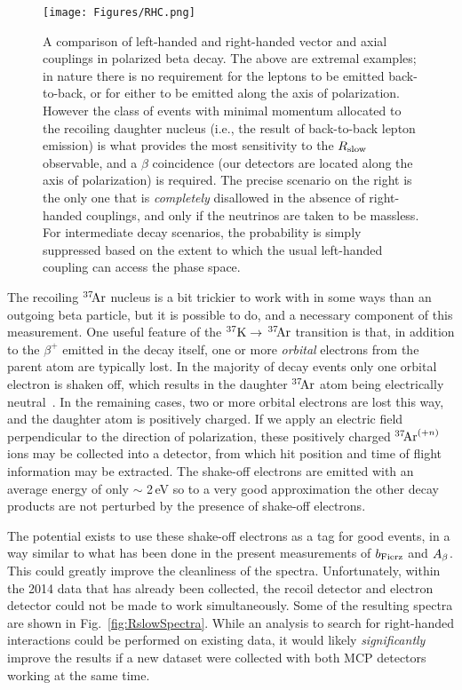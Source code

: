 \begin{figure}[h!t!b!]
	\centering
	\texttt{[image: Figures/RHC.png]}
	\caption[A Comparison of Left-Handed and Right-Handed Couplings]{A comparison of left-handed and right-handed vector and axial couplings in polarized beta decay.  The above are extremal examples;  in nature there is no requirement for the leptons to be emitted back-to-back, or for either to be emitted along the axis of polarization.  However the class of events with minimal momentum allocated to the recoiling daughter nucleus (i.e., the result of back-to-back lepton emission) is what provides the most sensitivity to the $R_{\textrm{slow}}$ observable, and a $\beta$ coincidence (our detectors are located along the axis of polarization) is required.
	The precise scenario on the right is the only one that is \emph{completely} disallowed in the absence of right-handed couplings, and only if the neutrinos are taken to be massless.  For intermediate decay scenarios, the probability is simply suppressed based on the extent to which the usual left-handed coupling can access the phase space.
	\label{fig:rhc}
	}
\end{figure}

The recoiling $^{37}\textrm{\!Ar}$ nucleus is a bit trickier to work with in some ways than an outgoing beta particle, but it is possible to do, and a necessary component of this measurement.  One useful feature of the $^{37}\textrm{K} \rightarrow \,^{37}\textrm{\!Ar}$ transition is that, in addition to the $\beta^+$ emitted in the decay itself, one or more \emph{orbital} electrons from the parent atom are typically lost.  In the majority of decay events only one orbital electron is shaken off, which results in the daughter $^{37}\textrm{\!Ar}$ atom being electrically neutral~\cite{gorelov2000}\cite{dan_thesis}.  In the remaining cases, two or more orbital electrons are lost this way, and the daughter atom is positively charged.  If we apply an electric field perpendicular to the direction of polarization, these positively charged $^{37}\textrm{\!Ar}^{(+n)}$ ions may be collected into a detector, from which hit position and time of flight information may be extracted.  The shake-off electrons are emitted with an average energy of only $\sim$ 2\,eV so to a very good approximation the other decay products are not perturbed by the presence of shake-off electrons\cite{Levinger}.  

The potential exists to use these shake-off electrons as a tag for good events, in a way similar to what has been done in the present measurements of $b_{\mathrm{Fierz}}$ and $A_{\beta}$.  This could greatly improve the cleanliness of the spectra.  Unfortunately, within the 2014 data that has already been collected, the recoil detector and electron detector could not be made to work simultaneously.  Some of the resulting spectra are shown in Fig.~\ref{fig:RslowSpectra}.  While an analysis to search for right-handed interactions could be performed on existing data, it would likely \emph{significantly} improve the results if a new dataset were collected with both \ac{MCP} detectors working at the same time. 

